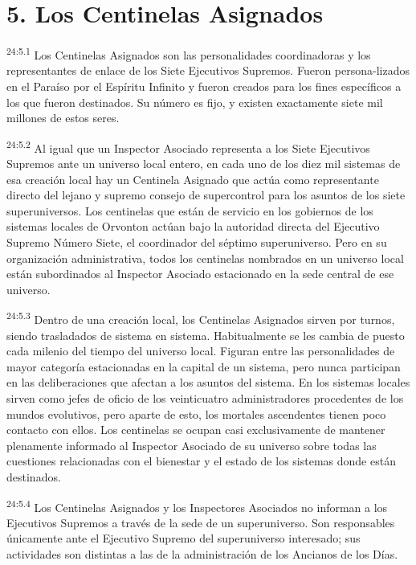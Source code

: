 \section*{5. Los Centinelas Asignados}
\par
\textsuperscript{24:5.1} Los Centinelas Asignados son las personalidades coordinadoras y los representantes de enlace de los Siete Ejecutivos Supremos. Fueron persona-lizados en el Paraíso por el Espíritu Infinito y fueron creados para los fines específicos a los que fueron destinados. Su número es fijo, y existen exactamente siete mil millones de estos seres.

\par
\textsuperscript{24:5.2} Al igual que un Inspector Asociado representa a los Siete Ejecutivos Supremos ante un universo local entero, en cada uno de los diez mil sistemas de esa creación local hay un Centinela Asignado que actúa como representante directo del lejano y supremo consejo de supercontrol para los asuntos de los siete superuniversos. Los centinelas que están de servicio en los gobiernos de los sistemas locales de Orvonton actúan bajo la autoridad directa del Ejecutivo Supremo Número Siete, el coordinador del séptimo superuniverso. Pero en su organización administrativa, todos los centinelas nombrados en un universo local están subordinados al Inspector Asociado estacionado en la sede central de ese universo.

\par
\textsuperscript{24:5.3} Dentro de una creación local, los Centinelas Asignados sirven por turnos, siendo trasladados de sistema en sistema. Habitualmente se les cambia de puesto cada milenio del tiempo del universo local. Figuran entre las personalidades de mayor categoría estacionadas en la capital de un sistema, pero nunca participan en las deliberaciones que afectan a los asuntos del sistema. En los sistemas locales sirven como jefes de oficio de los veinticuatro administradores procedentes de los mundos evolutivos, pero aparte de esto, los mortales ascendentes tienen poco contacto con ellos. Los centinelas se ocupan casi exclusivamente de mantener plenamente informado al Inspector Asociado de su universo sobre todas las cuestiones relacionadas con el bienestar y el estado de los sistemas donde están destinados.

\par
\textsuperscript{24:5.4} Los Centinelas Asignados y los Inspectores Asociados no informan a los Ejecutivos Supremos a través de la sede de un superuniverso. Son responsables únicamente ante el Ejecutivo Supremo del superuniverso interesado; sus actividades son distintas a las de la administración de los Ancianos de los Días.

